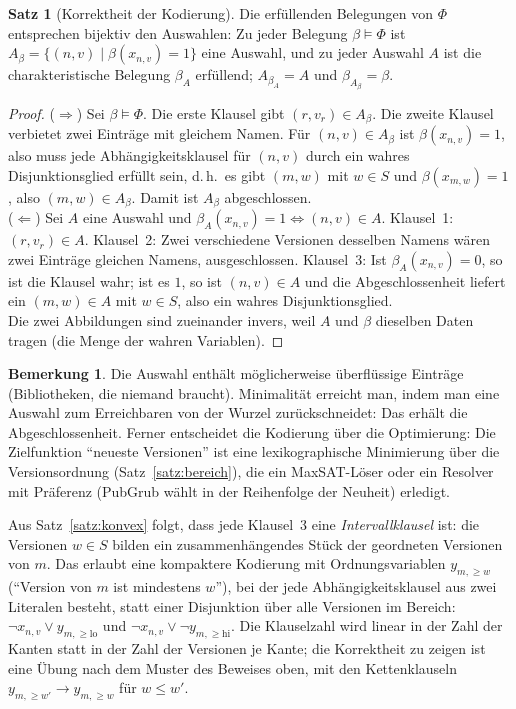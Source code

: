 \documentclass[a4paper,12pt,twoside]{report}
\DeclareRobustCommand{\_}{\ifmmode\mbox{\textunderscore}\else\textunderscore\allowbreak{}\fi}
\theoremstyle{definition}
\newtheorem{satz}{Satz}[chapter]
\newtheorem{bemerkung}{Bemerkung}[chapter]
\begin{document}
\begin{satz}[Korrektheit der Kodierung]\label{satz:sat}
	Die erfüllenden Belegungen von $\Phi$ entsprechen bijektiv den Auswahlen: Zu jeder Belegung $\beta\models\Phi$ ist $A_\beta=\{(n,v)\mid\beta(x_{n,v})=1\}$ eine Auswahl, und zu jeder Auswahl $A$ ist die charakteristische Belegung $\beta_A$ erfüllend; $A_{\beta_A}=A$ und $\beta_{A_\beta}=\beta$.
\end{satz}
\begin{proof}
	($\Rightarrow$) Sei $\beta\models\Phi$. Die erste Klausel gibt $(r,v_r)\in A_\beta$. Die zweite Klausel verbietet zwei Einträge mit gleichem Namen. Für $(n,v)\in A_\beta$ ist $\beta(x_{n,v})=1$, also muss jede Abhängigkeitsklausel für $(n,v)$ durch ein wahres Disjunktionsglied erfüllt sein, d.\,h.\ es gibt $(m,w)$ mit $w\in S$ und $\beta(x_{m,w})=1$, also $(m,w)\in A_\beta$. Damit ist $A_\beta$ abgeschlossen.\\
	($\Leftarrow$) Sei $A$ eine Auswahl und $\beta_A(x_{n,v})=1\iff(n,v)\in A$. Klausel~1: $(r,v_r)\in A$. Klausel~2: Zwei verschiedene Versionen desselben Namens wären zwei Einträge gleichen Namens, ausgeschlossen. Klausel~3: Ist $\beta_A(x_{n,v})=0$, so ist die Klausel wahr; ist es $1$, so ist $(n,v)\in A$ und die Abgeschlossenheit liefert ein $(m,w)\in A$ mit $w\in S$, also ein wahres Disjunktionsglied.\\
	Die zwei Abbildungen sind zueinander invers, weil $A$ und $\beta$ dieselben Daten tragen (die Menge der wahren Variablen).
\end{proof}

\begin{bemerkung}
	Die Auswahl enthält möglicherweise überflüssige Einträge (Bibliotheken, die niemand braucht). Minimalität erreicht man, indem man eine Auswahl zum Erreichbaren von der Wurzel zurückschneidet: Das erhält die Abgeschlossenheit. Ferner entscheidet die Kodierung über die Optimierung: Die Zielfunktion ``neueste Versionen'' ist eine lexikographische Minimierung über die Versionsordnung (Satz~\ref{satz:bereich}), die ein MaxSAT-Löser oder ein Resolver mit Präferenz (PubGrub wählt in der Reihenfolge der Neuheit) erledigt.
\end{bemerkung}

Aus Satz~\ref{satz:konvex} folgt, dass jede Klausel~3 eine \emph{Intervallklausel} ist: die Versionen $w\in S$ bilden ein zusammenhängendes Stück der geordneten Versionen von $m$. Das erlaubt eine kompaktere Kodierung mit Ordnungsvariablen $y_{m,\ge w}$ (``Version von $m$ ist mindestens $w$''), bei der jede Abhängigkeitsklausel aus zwei Literalen besteht, statt einer Disjunktion über alle Versionen im Bereich: $\neg x_{n,v}\vee y_{m,\ge\mathrm{lo}}$ und $\neg x_{n,v}\vee\neg y_{m,\ge\mathrm{hi}}$. Die Klauselzahl wird linear in der Zahl der Kanten statt in der Zahl der Versionen je Kante; die Korrektheit zu zeigen ist eine Übung nach dem Muster des Beweises oben, mit den Kettenklauseln $y_{m,\ge w'}\to y_{m,\ge w}$ für $w\le w'$.
\end{document}
